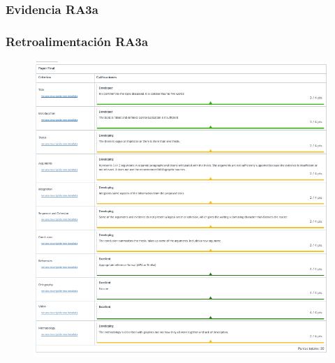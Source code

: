 \subsubsection{Evidencia RA3a}


\subsubsection{Retroalimentación RA3a}
\begin{figure}[!htbp]
    \centering
    \includegraphics[width=\textwidth]{recursos/ra3/paper.png}
\end{figure}

